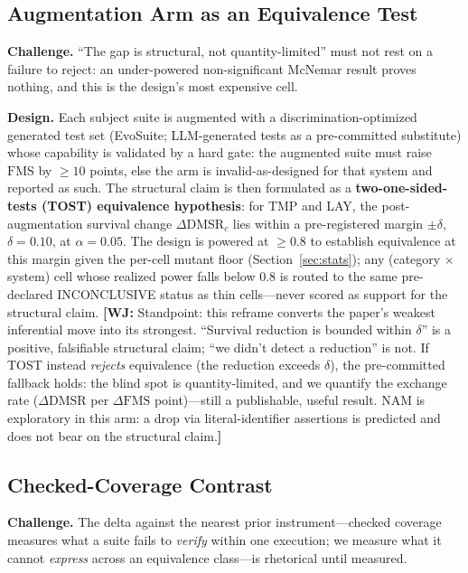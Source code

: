 \documentclass[conference]{IEEEtran}
\newcommand{\wj}[1]{{\color{blue}\footnotesize\textbf{[WJ:} #1\textbf{]}}}
\newcommand{\dmsr}{\mathrm{DMSR}}
\newcommand{\fms}{\mathrm{FMS}}
\begin{document}
\subsection{Augmentation Arm as an Equivalence Test}\label{sec:augment}

\textbf{Challenge.} ``The gap is structural, not quantity-limited'' must not rest on a failure to reject: an under-powered non-significant McNemar result proves nothing, and this is the design's most expensive cell.

\textbf{Design.} Each subject suite is augmented with a discrimination-optimized generated test set (EvoSuite; LLM-generated tests as a pre-committed substitute) whose capability is validated by a hard gate: the augmented suite must raise $\fms$ by $\geq 10$ points, else the arm is invalid-as-designed for that system and reported as such. The structural claim is then formulated as a \textbf{two-one-sided-tests (TOST) equivalence hypothesis}: for TMP and LAY, the post-augmentation survival change $\Delta\dmsr_c$ lies within a pre-registered margin $\pm\delta$, $\delta = 0.10$, at $\alpha = 0.05$. The design is powered at $\geq 0.8$ to establish equivalence at this margin given the per-cell mutant floor (Section~\ref{sec:stats}); any (category $\times$ system) cell whose realized power falls below 0.8 is routed to the same pre-declared INCONCLUSIVE status as thin cells---never scored as support for the structural claim. \wj{Standpoint: this reframe converts the paper's weakest inferential move into its strongest. ``Survival reduction is bounded within $\delta$'' is a positive, falsifiable structural claim; ``we didn't detect a reduction'' is not. If TOST instead \emph{rejects} equivalence (the reduction exceeds $\delta$), the pre-committed fallback holds: the blind spot is quantity-limited, and we quantify the exchange rate ($\Delta\dmsr$ per $\Delta\fms$ point)---still a publishable, useful result. NAM is exploratory in this arm: a drop via literal-identifier assertions is predicted and does not bear on the structural claim.}

\subsection{Checked-Coverage Contrast}\label{sec:cc-design}

\textbf{Challenge.} The delta against the nearest prior instrument---checked coverage measures what a suite fails to \emph{verify} within one execution; we measure what it cannot \emph{express} across an equivalence class---is rhetorical until measured.
\end{document}

